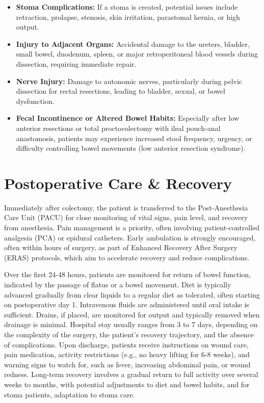 \begin{itemize}
\begin{itemize}
      \item \textbf{Stoma Complications:} If a stoma is created, potential issues include retraction, prolapse, stenosis, skin irritation, parastomal hernia, or high output.
      \item \textbf{Injury to Adjacent Organs:} Accidental damage to the ureters, bladder, small bowel, duodenum, spleen, or major retroperitoneal blood vessels during dissection, requiring immediate repair.
      \item \textbf{Nerve Injury:} Damage to autonomic nerves, particularly during pelvic dissection for rectal resections, leading to bladder, sexual, or bowel dysfunction.
      \item \textbf{Fecal Incontinence or Altered Bowel Habits:} Especially after low anterior resections or total proctocolectomy with ileal pouch-anal anastomosis, patients may experience increased stool frequency, urgency, or difficulty controlling bowel movements (low anterior resection syndrome).
    \end{itemize}
\end{itemize}

\section*{Postoperative Care \& Recovery}
Immediately after colectomy, the patient is transferred to the Post-Anesthesia Care Unit (PACU) for close monitoring of vital signs, pain level, and recovery from anesthesia. Pain management is a priority, often involving patient-controlled analgesia (PCA) or epidural catheters. Early ambulation is strongly encouraged, often within hours of surgery, as part of Enhanced Recovery After Surgery (ERAS) protocols, which aim to accelerate recovery and reduce complications.

Over the first 24-48 hours, patients are monitored for return of bowel function, indicated by the passage of flatus or a bowel movement. Diet is typically advanced gradually from clear liquids to a regular diet as tolerated, often starting on postoperative day 1. Intravenous fluids are administered until oral intake is sufficient. Drains, if placed, are monitored for output and typically removed when drainage is minimal. Hospital stay usually ranges from 3 to 7 days, depending on the complexity of the surgery, the patient's recovery trajectory, and the absence of complications. Upon discharge, patients receive instructions on wound care, pain medication, activity restrictions (e.g., no heavy lifting for 6-8 weeks), and warning signs to watch for, such as fever, increasing abdominal pain, or wound redness. Long-term recovery involves a gradual return to full activity over several weeks to months, with potential adjustments to diet and bowel habits, and for stoma patients, adaptation to stoma care.

